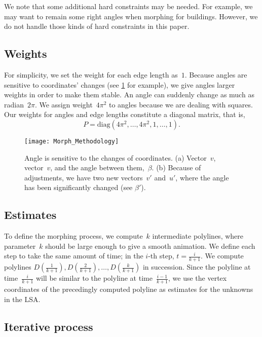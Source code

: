 We note that some additional hard constraints may be needed. 
For example, we may want to remain some right angles 
when morphing for buildings.
However, we do not handle those kinds of 
hard constraints in this paper.

\subsection{Weights}
\label{sec:Morph_Weights}

For simplicity, we set the weight for each edge length as~$1$.
Because angles are sensitive to coordinates' changes
(see \fig\ref{fig:Morph_Weights} for example),
we give angles larger weights
in order to make them stable.
An angle can suddenly change as much as radian~$2\pi$.
We assign weight~$4\pi^2$ to angles 
because we are dealing with squares.
Our weights for angles and edge lengths constitute 
a diagonal matrix, that is,
$$
P=\mathrm{diag} (4\pi^2, \ldots,4\pi^2, 1,\ldots,1).
$$


\begin{figure}[tb]
	\centering	
	\texttt{[image: Morph\_Methodology]}
	\caption{Angle is sensitive 
		to the changes of coordinates. 
		(a) Vector~$v$, vector~$v$, 
		and the angle between them,~$\beta$.
		(b) Because of adjustments, 
		we have two new vectors~$v'$ and~$u'$,
		where the angle has been significantly changed
		(see $\beta'$).
	}
	\label{fig:Morph_Weights}
\end{figure}

\subsection{Estimates}
\label{sec:Morph_Estimates}

To define the morphing process, 
we compute~$k$ intermediate polylines,
where parameter~$k$ should be large enough 
to give a smooth animation.
We define each step to take the same amount of time; 
in the $i$-th step, $t=\frac{i}{k + 1}$. 
We compute polylines
$D(\frac{1}{k + 1}), D(\frac{2}{k + 1}),
\ldots, D(\frac{k}{k + 1})$ in succession. 
Since the polyline at time~$\frac{i}{k + 1}$ 
will be similar to the polyline at time~$\frac{i-1}{k + 1}$, 
we use the vertex coordinates of 
the precedingly computed polyline as 
estimates for the unknowns in the LSA.



\subsection{Iterative process}\label{sec:Morph_Iterative}

